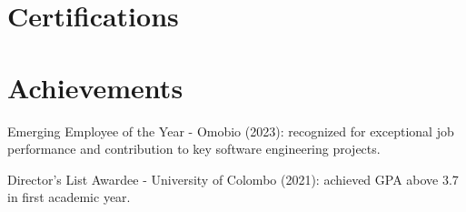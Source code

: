 \documentclass[10.5pt]{article}
\begin{document}
\section*{Certifications}

\section*{Achievements}
\begin{cvitems}
  \item Emerging Employee of the Year - Omobio (2023): recognized for exceptional job performance and contribution to key software engineering projects.
  \item Director's List Awardee - University of Colombo (2021): achieved GPA above 3.7 in first academic year.
\end{cvitems}
\end{document}
